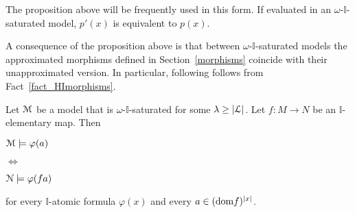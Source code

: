 \documentclass[10pt,oneside]{amsproc}
\begin{document}
\def\ceq#1#2#3{\parbox[t]{20ex}{$\displaystyle #1$}\parbox{5ex}{\hfil $#2$}{$\displaystyle #3$}}

\begin{remark}\label{remk_p'p}
  The  proposition above will be frequently used in this form.
  If evaluated in an $\omega$-$\mathds{I}$-saturated model, $p'(x)$ is equivalent to $p(x)$.
\end{remark}

A consequence of the proposition above is that between $\omega$-$\mathds{I}$-saturated models the approximated morphisms defined in Section~\ref{morphisms} coincide with their unapproximated version.
In particular, following follows from Fact~\ref{fact_HImorphisms}.

\begin{corollary}\label{corol_omega_sat}
  Let ${\EuScript M}$ be a model that is $\omega$-$\mathds{I}$-saturated for some $\lambda\ge|{\EuScript L}|$.
  Let $f:M\to N$ be an $\mathds{I}$-elementary map.
  Then

  \ceq{\hfill{\EuScript M}\models\varphi(a)}{\Leftrightarrow}{{\EuScript N}\models\varphi(fa)}

  for every $\mathds{I}$-atomic formula $\varphi(x)$ and every $a\in({\rm dom }f)^{|x|}$.
\end{corollary}





  
\end{document}
